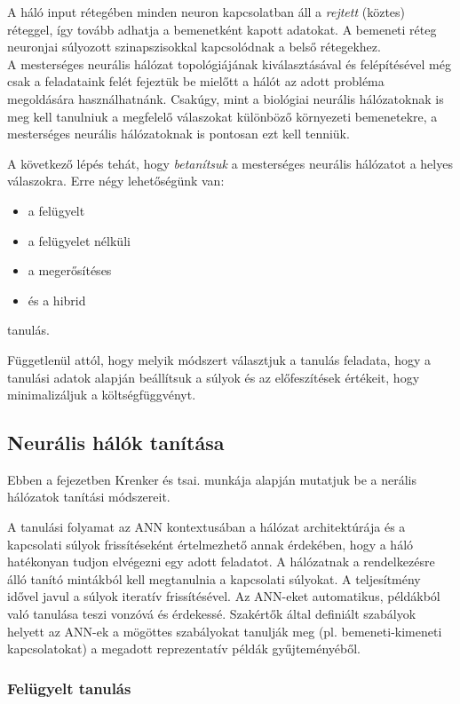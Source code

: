 \documentclass[12pt,a4]{article}
\begin{document}
	A háló input rétegében minden neuron kapcsolatban áll a \textit{rejtett} (köztes) réteggel, így tovább adhatja a bemenetként kapott adatokat. A bemeneti réteg neuronjai súlyozott szinapszisokkal kapcsolódnak a belső rétegekhez.\\
	
	A mesterséges neurális hálózat 
	topológiájának kiválasztásával és 
	felépítésével még csak a feladataink 
	felét fejeztük be mielőtt a hálót az 
	adott probléma megoldására használhatnánk.
	Csakúgy, mint a biológiai neurális hálózatoknak
	is meg kell tanulniuk a megfelelő válaszokat különböző környezeti bemenetekre, a mesterséges neurális hálózatoknak is pontosan ezt kell tenniük.
	
	
	A következő lépés tehát, hogy \textit{betanítsuk} a mesterséges neurális hálózatot a helyes válaszokra.
	Erre négy lehetőségünk van:
	\begin{itemize}
		\item a felügyelt
		\item a felügyelet nélküli
		\item a megerősítéses
		\item és a hibrid
	\end{itemize}
	tanulás.
	
	 Függetlenül attól, hogy melyik módszert választjuk a tanulás feladata, hogy a tanulási adatok alapján beállítsuk a súlyok és az előfeszítések értékeit, hogy minimalizáljuk a 
	költségfüggvényt.
	
	\subsection{Neurális hálók tanítása}
    Ebben a fejezetben \cite{krenker}Krenker és tsai. munkája alapján mutatjuk be a nerális hálózatok tanítási módszereit.
 
	A tanulási folyamat az \cite{ann2}ANN kontextusában a
	hálózat architektúrája és a kapcsolati súlyok frissítéseként értelmezhető annak érdekében, hogy a háló hatékonyan tudjon elvégezni egy adott feladatot.
	A hálózatnak a rendelkezésre álló tanító mintákból kell megtanulnia a kapcsolati súlyokat. A teljesítmény idővel javul a súlyok iteratív frissítésével.
	Az ANN-eket automatikus, példákból való tanulása teszi 
	vonzóvá és érdekessé. Szakértők által definiált szabályok helyett az ANN-ek a mögöttes szabályokat tanulják meg (pl. bemeneti-kimeneti kapcsolatokat) a megadott reprezentatív példák gyűjteményéből.
	
	\subsubsection{Felügyelt tanulás}
	
\end{document}
